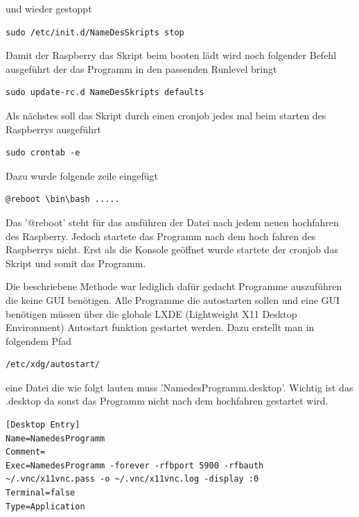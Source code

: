 \documentclass[11pt,a4paper]{article} %
\begin{document}
und wieder gestoppt
\begin{frame}

\begin{lstlisting}
sudo /etc/init.d/NameDesSkripts stop
\end{lstlisting}
\end{frame}

Damit der Raspberry das Skript beim booten lädt wird noch folgender Befehl ausgeführt der das Programm in den passenden Runlevel bringt
\begin{frame}

\begin{lstlisting}
sudo update-rc.d NameDesSkripts defaults
\end{lstlisting}
\end{frame}
\par

Als nächstes soll das Skript durch einen cronjob jedes mal beim starten des Raspberrys ausgeführt
\begin{frame}

\begin{lstlisting}
sudo crontab -e
\end{lstlisting}
\end{frame}
\newpage
Dazu wurde folgende zeile eingefügt
\begin{frame}

\begin{lstlisting}
@reboot \bin\bash .....
\end{lstlisting}
\end{frame}
Das '@reboot' steht für das ausführen der Datei nach jedem neuen hochfahren des Raspberry. Jedoch startete das Programm nach dem hoch fahren des Raspberrys nicht. Erst als die Konsole geöffnet wurde startete der cronjob das Skript und somit das Programm.
\par
Die beschriebene Methode war lediglich dafür gedacht Programme auszuführen die keine GUI benötigen. Alle Programme die autostarten sollen und eine GUI benötigen müssen über die globale LXDE (Lightweight X11 Desktop Environment) Autostart funktion gestartet werden.
Dazu erstellt man in folgendem Pfad
\begin{frame}

\begin{lstlisting}
/etc/xdg/autostart/
\end{lstlisting}
\end{frame}
eine Datei die wie folgt lauten muss 'NamedesProgramm.desktop'. Wichtig ist das .desktop da sonst das Programm nicht nach dem hochfahren gestartet wird.
\begin{frame}

\begin{lstlisting}
[Desktop Entry]
Name=NamedesProgramm
Comment=
Exec=NamedesProgramm -forever -rfbport 5900 -rfbauth ~/.vnc/x11vnc.pass -o ~/.vnc/x11vnc.log -display :0
Terminal=false
Type=Application
\end{lstlisting}
\end{frame}
\end{document}
